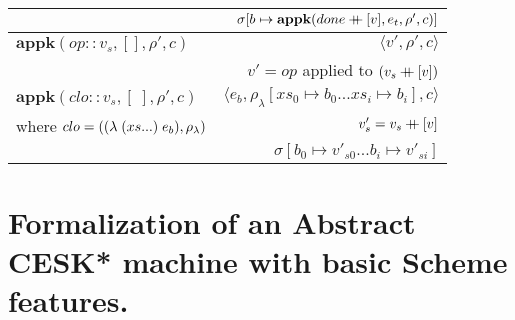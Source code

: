 \documentclass[12pt,draft]{article}
\newcommand\mdoubleplus{\ensuremath{\mathbin{+\mkern-9mu+}}}
\begin{document}
\begin{center}
\begin{tabular}{@{}l | r@{}}
& $ \sigma[b \mapsto \textbf{appk}(done \mdoubleplus [v] , e_t , \rho' , c)] $ \\
\hline
$ \textbf{appk}(op :: v_s , [] , \rho' , c) $
& $\langle v' , \rho' , c \rangle$ \\
& $ v' = op $ applied to $(v_s \mdoubleplus [v])$ \\
\hline
$ \textbf{appk}(clo :: v_s, [\;] , \rho' , c) $
& $\langle e_b , \rho_{\lambda}[xs_0 \mapsto b_0 ... xs_i \mapsto b_i] , c \rangle$ \\
where $ clo = ((\lambda\;(xs ...)\;e_b) , \rho_{\lambda}) $ & $ v'_s = v_s \mdoubleplus [v] $ \\
& $ \sigma[b_0 \mapsto v'_{s0} ... b_i \mapsto v'_{si}] $  \\
\hline
\end{tabular}
\end{center}

\newpage

\section{Formalization of an Abstract CESK* machine with basic Scheme features.}
\end{document}

